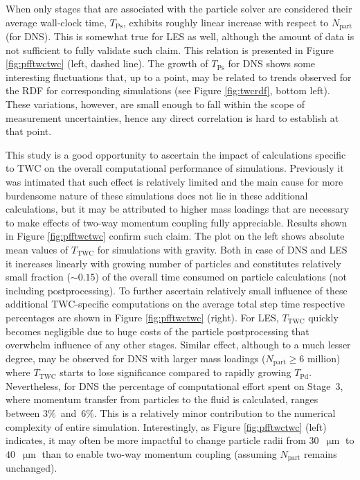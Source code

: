 \documentclass{pracamgren}
\begin{document}
When only stages that are associated with the particle solver are considered their average wall-clock time, $T_{\text{Ps}}$, exhibits roughly linear increase with respect to $N_{\text{part}}$ (for DNS).
This is somewhat true for LES as well, although the amount of data is not sufficient to fully validate such claim.
This relation is presented in Figure \ref{fig:pfftwctwc} (left, dashed line).
The growth of $T_{\text{Ps}}$ for DNS shows some interesting fluctuations that, up to a point, may be related to trends observed for the RDF for corresponding simulations (see Figure \ref{fig:twcrdf}, bottom left).
These variations, however, are small enough to fall within the scope of measurement uncertainties, hence any direct correlation is hard to establish at that point.

This study is a good opportunity to ascertain the impact of calculations specific to TWC on the overall computational performance of simulations.
Previously it was intimated that such effect is relatively limited and the main cause for more burdensome nature of these simulations does not lie in these additional calculations, but it may be attributed to higher mass loadings that are necessary to make effects of two-way momentum coupling fully appreciable.
Results shown in Figure \ref{fig:pfftwctwc} confirm such claim.
The plot on the left shows absolute mean values of $T_{\text{TWC}}$ for simulations with gravity.
Both in case of DNS and LES it increases linearly with growing number of particles and constitutes relatively small fraction (${\sim 0.15}$) of the overall time consumed on particle calculations (not including postprocessing).
To further ascertain relatively small influence of these additional TWC-specific computations on the average total step time respective percentages are shown in Figure \ref{fig:pfftwctwc} (right).
For LES, $T_{\text{TWC}}$ quickly becomes negligible due to huge costs of the particle postprocessing that overwhelm influence of any other stages.
Similar effect, although to a much lesser degree, may be observed for DNS with larger mass loadings ($N_{\text{part}} \ge 6$ million) where $T_{\text{TWC}}$ starts to lose significance compared to rapidly growing $T_{\text{Pd}}$.
Nevertheless, for DNS the percentage of computational effort spent on Stage~$3$, where momentum transfer from particles to the fluid is calculated, ranges between $3 \%$~and~$6 \%$.
This is a relatively minor contribution to the numerical complexity of entire simulation.
Interestingly, as Figure \ref{fig:pfftwctwc} (left) indicates, it may often be more impactful to change particle radii from $30$~$\upmu\text{m}$ to $40$~$\upmu\text{m}$ than to enable two-way momentum coupling (assuming $N_{\text{part}}$ remains unchanged).
\end{document}
